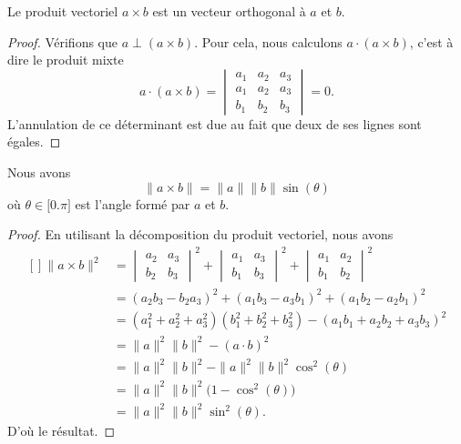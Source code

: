 \begin{proposition}
    Le produit vectoriel $a\times b$ est un vecteur orthogonal à $a$ et $b$.
\end{proposition}

\begin{proof}
    Vérifions que $a\perp (a\times b)$. Pour cela, nous calculons $a\cdot (a\times b)$, c'est à dire le produit mixte
    \begin{equation}
        a\cdot(a\times b)=\begin{vmatrix}
            a_1    &   a_2    &   a_3    \\
            a_1    &   a_2    &   a_3    \\
            b_1    &   b_2    &   b_3
        \end{vmatrix}=0.
    \end{equation}
    L'annulation de ce déterminant est due au fait que deux de ses lignes sont égales.
\end{proof}

\begin{proposition}     \label{PropNormeProdVectoabsint}
    Nous avons
    \begin{equation}
        \| a\times b \|=\| a \|\| b \|\sin(\theta)
    \end{equation}
    où $\theta\in\mathopen[ 0.\pi \mathclose]$ est l'angle formé par $a$ et $b$.
\end{proposition}

\begin{proof}
    En utilisant la décomposition du produit vectoriel, nous avons
    \begin{equation}
        \begin{aligned}[]
            \| a\times b \|^2&=\begin{vmatrix}
                a_2    &   a_3    \\ 
                b_2    &   b_3    
            \end{vmatrix}^2+\begin{vmatrix}
                a_1    &   a_3    \\ 
                b_1    &   b_3    
            \end{vmatrix}^2+\begin{vmatrix}
                a_1    &   a_2    \\ 
                b_1    &   b_2    
            \end{vmatrix}^2\\
            &=(a_2b_3-b_2a_3)^2+(a_1b_3-a_3b_1)^2+(a_1b_2-a_2b_1)^2\\
            &=(a_1^2+a_2^2+a_3^2)(b_1^2+b_2^2+b_3^2)-(a_1b_1+a_2b_2+a_3b_3)^2\\
            &=\| a \|^2\| b \|^2-(a\cdot b)^2\\
            &=\| a \|^2\| b \|^2-\| a \|^2\| b \|^2\cos^2(\theta)\\
            &=\| a \|^2\| b \|^2\big( 1-\cos^2(\theta) \big)\\
            &=\| a \|^2\| b \|^2\sin^2(\theta).
        \end{aligned}
    \end{equation}
    D'où le résultat.
\end{proof}

